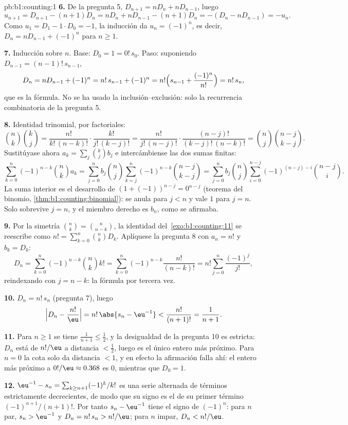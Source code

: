 \begin{solution}{pb:b1:counting:1}
\textbf{6.} De la pregunta 5, $D_{n+1} = nD_n + nD_{n-1}$, luego
\[
u_{n+1} = D_{n+1} - (n+1)D_n = nD_n + nD_{n-1} - (n+1)D_n
= -(D_n - nD_{n-1}) = -u_n .
\]
Como $u_1 = D_1 - 1 \cdot D_0 = -1$, la inducción da $u_n = (-1)^n$, es
decir, $D_n = nD_{n-1} + (-1)^n$ para $n \geq 1$.

\textbf{7.} Inducción sobre $n$. Base: $D_0 = 1 = 0!\,s_0$. Paso:
suponiendo $D_{n-1} = (n-1)!\,s_{n-1}$,
\[
D_n = nD_{n-1} + (-1)^n = n!\,s_{n-1} + (-1)^n
= n!\Bigl(s_{n-1} + \frac{(-1)^n}{n!}\Bigr) = n!\,s_n ,
\]
que es la fórmula. No se ha usado la inclusión--exclusión: solo la
recurrencia combinatoria de la pregunta 5.

\textbf{8.} Identidad trinomial, por factoriales:
\[
\binom nk \binom kj
= \frac{n!}{k!\,(n-k)!} \cdot \frac{k!}{j!\,(k-j)!}
= \frac{n!}{j!\,(n-j)!} \cdot \frac{(n-j)!}{(k-j)!\,(n-k)!}
= \binom nj \binom{n-j}{k-j} .
\]
Sustitúyase ahora $a_k = \sum_j \binom kj b_j$ e intercámbiense las dos
sumas finitas:
\[
\sum_{k=0}^{n} (-1)^{n-k} \binom nk a_k
= \sum_{j=0}^{n} b_j \binom nj
\sum_{k=j}^{n} (-1)^{n-k} \binom{n-j}{k-j}
= \sum_{j=0}^{n} b_j \binom nj
\sum_{i=0}^{n-j} (-1)^{(n-j)-i} \binom{n-j}{i} .
\]
La suma interior es el desarrollo de $(1 + (-1))^{n-j} = 0^{n-j}$
(teorema del binomio, \cref{thm:b1:counting:binomial}): se anula para
$j < n$ y vale $1$ para $j = n$. Solo sobrevive $j = n$, y el miembro
derecho es $b_n$, como se afirmaba.

\textbf{9.} Por la simetría $\binom nk = \binom n{n-k}$, la identidad
del~\cref{exo:b1:counting:11} se reescribe como
$n! = \sum_{k=0}^n \binom nk D_k$. Aplíquese la pregunta 8 con
$a_n = n!$ y $b_k = D_k$:
\[
D_n = \sum_{k=0}^{n} (-1)^{n-k} \binom nk k!
= \sum_{k=0}^{n} (-1)^{n-k} \frac{n!}{(n-k)!}
= n! \sum_{j=0}^{n} \frac{(-1)^j}{j!} ,
\]
reindexando con $j = n - k$: la fórmula por tercera vez.

\textbf{10.} $D_n = n!\,s_n$ (pregunta 7), luego
\[
\Bigl| D_n - \frac{n!}{\eu} \Bigr|
= n!\,\abs{s_n - \eu^{-1}} < \frac{n!}{(n+1)!} = \frac1{n+1} .
\]

\textbf{11.} Para $n \geq 1$ se tiene $\frac1{n+1} \leq \frac12$, y la
desigualdad de la pregunta 10 es estricta: $D_n$ está de
$n!/\eu$ a distancia $< \frac12$, luego es el único entero más
próximo. Para
$n = 0$ la cota solo da distancia $< 1$, y en efecto la afirmación
falla ahí: el entero más próximo a $0!/\eu \approx 0.368$ es $0$,
mientras que $D_0 = 1$.

\textbf{12.} $\eu^{-1} - s_n = \sum_{k \geq n+1} (-1)^k/k!$ es una serie
alternada de términos estrictamente decrecientes, de modo que su signo
es el de su primer término $(-1)^{n+1}/(n+1)!$. Por tanto
$s_n - \eu^{-1}$ tiene el signo de $(-1)^n$: para $n$ par,
$s_n > \eu^{-1}$ y $D_n = n!\,s_n > n!/\eu$; para $n$ impar,
$D_n < n!/\eu$.


\end{solution}
